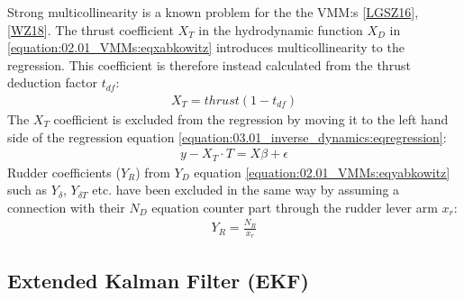 \documentclass[review]{elsarticle}
\begin{document}
\sphinxAtStartPar
Strong multicollinearity is a known problem for the the VMM:s {[}\hyperlink{cite.bibligraphy:id36}{LGSZ16}{]}, {[}\hyperlink{cite.bibligraphy:id58}{WZ18}{]}.
The thrust coefficient \(X_T\) in the hydrodynamic function \(X_D\) in \autoref{equation:02.01_VMMs:eqxabkowitz} introduces multicollinearity to the regression. This coefficient is therefore instead calculated from the thrust deduction factor \(t_{df}\):
\begin{equation}\label{equation:03.01_inverse_dynamics:eqXthrust}
\begin{split}\displaystyle X_{T} = thrust \left(1 - t_{df}\right)\end{split}
\end{equation}
\sphinxAtStartPar
The \(X_T\) coefficient is excluded from the regression by moving it to the left hand side of the regression equation \autoref{equation:03.01_inverse_dynamics:eqregression}:
\begin{equation}\label{equation:03.01_inverse_dynamics:eqexclude}
\begin{split}y-X_T \cdot T = X \beta + \epsilon\end{split}
\end{equation}
\sphinxAtStartPar
Rudder coefficients (\(Y_R\)) from \(Y_D\) equation \autoref{equation:02.01_VMMs:eqyabkowitz} such as \(Y_{\delta}\), \(Y_{\delta T}\) etc. have been excluded in the same way by assuming a connection with their \(N_D\) equation counter part through the rudder lever arm \(x_r\):
\begin{equation}\label{equation:03.01_inverse_dynamics:eqyr}
\begin{split}\displaystyle Y_{R} = \frac{N_{R}}{x_{r}}\end{split}
\end{equation}

\subsection{Extended Kalman Filter (EKF)}
\label{\detokenize{04.01_EK:extended-kalman-filter-ekf}}\label{\detokenize{04.01_EK::doc}}
\end{document}
